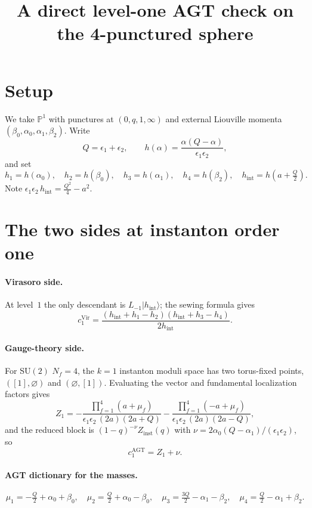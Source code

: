 \documentclass[11pt]{article}
\title{A direct level-one AGT check on the 4-punctured sphere}
\author{}
\date{}
\begin{document}
\maketitle

\section*{Setup}

We take $\mathbb{P}^1$ with punctures at $(0,q,1,\infty)$ and external Liouville
momenta $(\beta_0,\alpha_0,\alpha_1,\beta_2)$. Write
\[
Q=\epsilon_1+\epsilon_2,\qquad
h(\alpha)=\frac{\alpha(Q-\alpha)}{\epsilon_1\epsilon_2},
\]
and set
\[
h_1=h(\alpha_0),\quad h_2=h(\beta_0),\quad h_3=h(\alpha_1),\quad h_4=h(\beta_2),
\quad h_{\mathrm{int}}=h\!\left(a+\tfrac{Q}{2}\right).
\]
Note $\epsilon_1\epsilon_2\,h_{\mathrm{int}}=\frac{Q^2}{4}-a^2$.

\section*{The two sides at instanton order one}

\paragraph{Virasoro side.}
At level~$1$ the only descendant is $L_{-1}|h_{\mathrm{int}}\rangle$; the sewing
formula gives
\begin{equation}
\label{eq:vir}
c_1^{\mathrm{Vir}}
=\frac{(h_{\mathrm{int}}+h_1-h_2)(h_{\mathrm{int}}+h_3-h_4)}{2h_{\mathrm{int}}}.
\end{equation}

\paragraph{Gauge-theory side.}
For SU$(2)$ $N_f=4$, the $k=1$ instanton moduli space has two torus-fixed
points, $([1],\varnothing)$ and $(\varnothing,[1])$. Evaluating the vector and
fundamental localization factors gives
\[
Z_1
=-\frac{\prod_{f=1}^{4}(a+\mu_f)}{\epsilon_1\epsilon_2\,(2a)(2a+Q)}
-\frac{\prod_{f=1}^{4}(-a+\mu_f)}{\epsilon_1\epsilon_2\,(2a)(2a-Q)},
\]
and the reduced block is $(1-q)^{-\nu}Z_{\mathrm{inst}}(q)$ with
$\nu=2\alpha_0(Q-\alpha_1)/(\epsilon_1\epsilon_2)$, so
\begin{equation}
\label{eq:agt}
c_1^{\mathrm{AGT}}=Z_1+\nu.
\end{equation}

\paragraph{AGT dictionary for the masses.}
\begin{equation}
\label{eq:dict}
\mu_1=-\tfrac{Q}{2}+\alpha_0+\beta_0,\quad
\mu_2=\tfrac{Q}{2}+\alpha_0-\beta_0,\quad
\mu_3=\tfrac{3Q}{2}-\alpha_1-\beta_2,\quad
\mu_4=\tfrac{Q}{2}-\alpha_1+\beta_2.
\end{equation}
\end{document}
